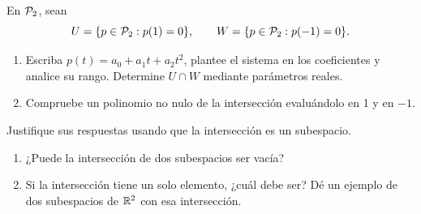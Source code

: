 \documentclass[compacto,10pt]{pubciencias-notas}
\begin{document}
\begin{ejer}
    En $\mathcal{P}_2$, sean
    \[
        U=\{p\in\mathcal{P}_2:p(1)=0\},\qquad
        W=\{p\in\mathcal{P}_2:p(-1)=0\}.
    \]
    \begin{enumerate}
        \item Escriba $p(t)=a_0+a_1t+a_2t^2$, plantee el sistema en
              los coeficientes y analice su rango. Determine $U\cap W$
              mediante parámetros reales.
        \item Compruebe un polinomio no nulo de la intersección evaluándolo
              en 1 y en $-1$.
    \end{enumerate}
\end{ejer}

\begin{ejer}
    Justifique sus respuestas usando que la intersección es un subespacio.
    \begin{enumerate}
        \item ¿Puede la intersección de dos subespacios ser vacía?
        \item Si la intersección tiene un solo elemento, ¿cuál debe ser?
              Dé un ejemplo de dos subespacios de $\mathbb{R}^2$ con esa intersección.
    \end{enumerate}
\end{ejer}
\end{document}
